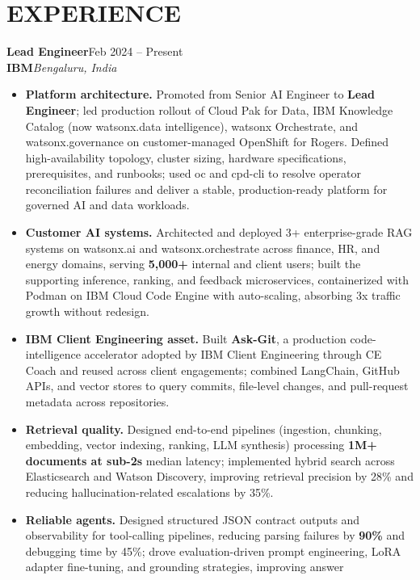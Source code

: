 \documentclass[letterpaper,10pt]{article}
\newcommand{\role}[4]{%
  \textbf{#1}\hfill{\color{muted}\small #2}\\[1pt]
  {\color{accent}\bfseries #3}\hfill{\color{muted}\small\itshape #4}\vspace{3pt}
}
\newcommand{\focus}[1]{\textbf{\color{accent}#1}}
\begin{document}
\section*{EXPERIENCE}

\role{Lead Engineer}{Feb 2024 -- Present}{IBM}{Bengaluru, India}
\begin{itemize}[itemsep=7pt]
  \item \focus{Platform architecture.} Promoted from Senior AI Engineer to \textbf{Lead Engineer}; led production rollout of
        Cloud Pak for Data, IBM Knowledge Catalog (now watsonx.data intelligence), watsonx Orchestrate, and
        watsonx.governance on customer-managed OpenShift for Rogers. Defined high-availability topology,
        cluster sizing, hardware specifications, prerequisites, and runbooks; used oc and cpd-cli to resolve
        operator reconciliation failures and deliver a stable, production-ready platform for governed AI and
        data workloads.
  \item \focus{Customer AI systems.} Architected and deployed 3+ enterprise-grade RAG systems on watsonx.ai and watsonx.orchestrate
        across finance, HR, and energy domains, serving \textbf{5,000+} internal and client users; built the
        supporting inference, ranking, and feedback microservices, containerized with Podman on IBM Cloud
        Code Engine with auto-scaling, absorbing 3x traffic growth without redesign.
  \item \focus{IBM Client Engineering asset.} Built \textbf{Ask-Git}, a production code-intelligence accelerator adopted by IBM Client
        Engineering through CE Coach and reused across client engagements; combined LangChain, GitHub APIs,
        and vector stores to query commits, file-level changes, and pull-request metadata across repositories.
  \item \focus{Retrieval quality.} Designed end-to-end pipelines (ingestion, chunking, embedding, vector indexing, ranking,
        LLM synthesis) processing \textbf{1M+ documents at sub-2s} median latency; implemented hybrid search across
        Elasticsearch and Watson Discovery, improving retrieval precision by 28\% and reducing
        hallucination-related escalations by 35\%.
  \item \focus{Reliable agents.} Designed structured JSON contract outputs and observability for tool-calling
        pipelines, reducing parsing failures by \textbf{90\%} and debugging time by 45\%; drove evaluation-driven
        prompt engineering, LoRA adapter fine-tuning, and grounding strategies, improving answer

\end{itemize}
\end{document}
